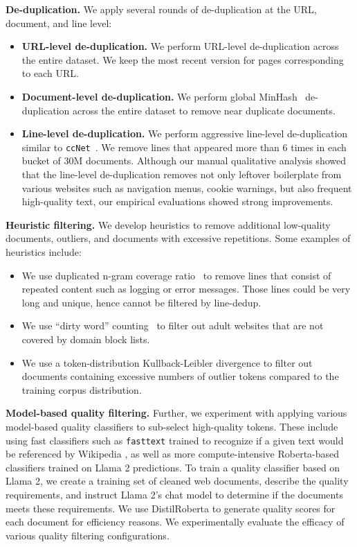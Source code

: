 \textbf{De-duplication.}
We apply several rounds of de-duplication at the URL, document, and line level:

\begin{itemize}
\item \textbf{URL-level de-duplication.} We perform URL-level de-duplication across the entire dataset. We keep the most recent version for pages corresponding to each URL.

\item \textbf{Document-level de-duplication.} We perform global MinHash~\citep{666900} de-duplication across the entire dataset to remove near duplicate documents.

\item \textbf{Line-level de-duplication.} We perform aggressive line-level de-duplication similar to \texttt{ccNet}~\citep{wenzek2019ccnetextractinghighquality}.
We remove lines that appeared more than 6 times in each bucket of 30M documents. Although our manual qualitative analysis showed that the line-level de-duplication removes not only leftover boilerplate from various websites such as navigation menus, cookie warnings, but also frequent high-quality text, our empirical evaluations showed strong improvements.

\end{itemize}

\textbf{Heuristic filtering.} We develop heuristics to remove additional low-quality documents, outliers, and documents with excessive repetitions. Some examples of heuristics include:

\begin{itemize}
\item We use duplicated n-gram coverage ratio~\citep{Rae2021ScalingLM} to remove lines that consist of repeated content such as logging or error messages. Those lines could be very long and unique, hence cannot be filtered by line-dedup. 
\item We use ``dirty word'' counting~\citep{raffel2020exploring} to filter out adult websites that are not covered by domain block lists.
\item We use a token-distribution Kullback-Leibler divergence to filter out documents containing excessive numbers of outlier tokens compared to the training corpus distribution.
\end{itemize}

\textbf{Model-based quality filtering.} Further, we experiment with applying various model-based quality classifiers to sub-select high-quality tokens. These include using fast classifiers such as \texttt{fasttext} \citep{joulin2017bag} trained to recognize if a given text would be referenced by Wikipedia \citep{touvron2023llama}, as well as more compute-intensive Roberta-based classifiers \citep{liu2019roberta} trained on Llama 2 predictions. To train a quality classifier based on Llama 2, we create a training set of cleaned web documents, describe the quality requirements, and instruct Llama 2's chat model to determine if the documents meets these requirements. We use DistilRoberta \citep{sanh2019distilbert} to generate quality scores for each document for efficiency reasons. We experimentally evaluate the efficacy of various quality filtering configurations.


